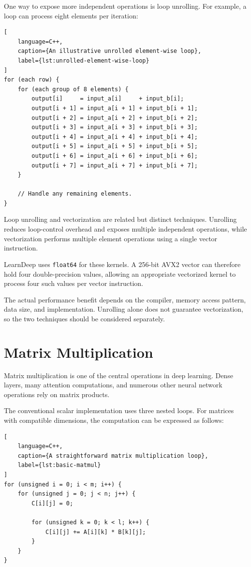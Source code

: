 One way to expose more independent operations is loop unrolling. For example, a loop can process eight elements per iteration:

\begin{lstlisting}[
    language=C++,
    caption={An illustrative unrolled element-wise loop},
    label={lst:unrolled-element-wise-loop}
]
for (each row) {
    for (each group of 8 elements) {
        output[i]     = input_a[i]     + input_b[i];
        output[i + 1] = input_a[i + 1] + input_b[i + 1];
        output[i + 2] = input_a[i + 2] + input_b[i + 2];
        output[i + 3] = input_a[i + 3] + input_b[i + 3];
        output[i + 4] = input_a[i + 4] + input_b[i + 4];
        output[i + 5] = input_a[i + 5] + input_b[i + 5];
        output[i + 6] = input_a[i + 6] + input_b[i + 6];
        output[i + 7] = input_a[i + 7] + input_b[i + 7];
    }

    // Handle any remaining elements.
}
\end{lstlisting}

Loop unrolling and vectorization are related but distinct techniques. Unrolling reduces loop-control overhead and exposes multiple independent operations, while vectorization performs multiple element operations using a single vector instruction.

LearnDeep uses \texttt{float64} for these kernels. A 256-bit AVX2 vector can therefore hold four double-precision values, allowing an appropriate vectorized kernel to process four such values per vector instruction.

The actual performance benefit depends on the compiler, memory access pattern, data size, and implementation. Unrolling alone does not guarantee vectorization, so the two techniques should be considered separately.

\section{Matrix Multiplication}

Matrix multiplication is one of the central operations in deep learning. Dense layers, many attention computations, and numerous other neural network operations rely on matrix products.

The conventional scalar implementation uses three nested loops. For matrices with compatible dimensions, the computation can be expressed as follows:

\begin{lstlisting}[
    language=C++,
    caption={A straightforward matrix multiplication loop},
    label={lst:basic-matmul}
]
for (unsigned i = 0; i < m; i++) {
    for (unsigned j = 0; j < n; j++) {
        C[i][j] = 0;

        for (unsigned k = 0; k < l; k++) {
            C[i][j] += A[i][k] * B[k][j];
        }
    }
}
\end{lstlisting}

